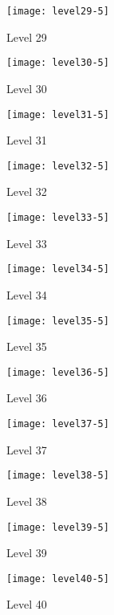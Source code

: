 \begin{figure}
  \centering
  \texttt{[image: level29-5]}
  \caption{Level 29}
  \label{fig:level29-stats}
\end{figure}
 
\begin{figure}
  \centering
  \texttt{[image: level30-5]}
  \caption{Level 30}
  \label{fig:level30-stats}
\end{figure}

\clearpage

\begin{figure}
  \centering
  \texttt{[image: level31-5]}
  \caption{Level 31}
  \label{fig:level31-stats}
\end{figure}
 
\begin{figure}
  \centering
  \texttt{[image: level32-5]}
  \caption{Level 32}
  \label{fig:level32-stats}
\end{figure}

\begin{figure}
  \centering
  \texttt{[image: level33-5]}
  \caption{Level 33}
  \label{fig:level33-stats}
\end{figure}
 
\begin{figure}
  \centering
  \texttt{[image: level34-5]}
  \caption{Level 34}
  \label{fig:level34-stats}
\end{figure}

\begin{figure}
  \centering
  \texttt{[image: level35-5]}
  \caption{Level 35}
  \label{fig:level35-stats}
\end{figure}
 
\begin{figure}
  \centering
  \texttt{[image: level36-5]}
  \caption{Level 36}
  \label{fig:level36-stats}
\end{figure}

\begin{figure}
  \centering
  \texttt{[image: level37-5]}
  \caption{Level 37}
  \label{fig:level37-stats}
\end{figure}
 
\begin{figure}
  \centering
  \texttt{[image: level38-5]}
  \caption{Level 38}
  \label{fig:level38-stats}
\end{figure}

\begin{figure}
  \centering
  \texttt{[image: level39-5]}
  \caption{Level 39}
  \label{fig:level39-stats}
\end{figure}
 
\begin{figure}
  \centering
  \texttt{[image: level40-5]}
  \caption{Level 40}
  \label{fig:level40-stats}
\end{figure}

\clearpage


